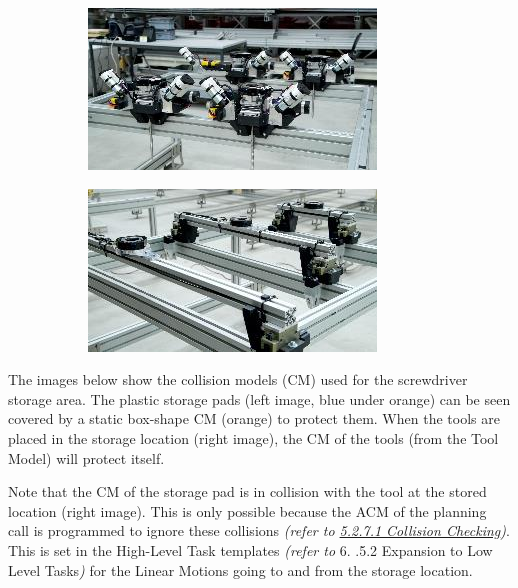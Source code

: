 \documentclass[11pt]{book}
\begin{document}
\begin{figure}[H]
\centering
\begin{subfigure}[b]{0.45\textwidth}
\centering
\includegraphics[width=\textwidth]{./images/image33.jpeg}
\end{subfigure}
\hfill
 \begin{subfigure}[b]{0.45\textwidth}
\centering
\includegraphics[width=\textwidth]{./images/image34.jpeg}
\end{subfigure}
\end{figure}


The images below show the collision models (CM) used for the screwdriver storage area. The plastic storage pads (left image, blue under orange) can be seen covered by a static box-shape CM (orange) to protect them. When the tools are placed in the storage location (right image), the CM of the tools (from the Tool Model) will protect itself.

Note that the CM of the storage pad is in collision with the tool at the stored location (right image). This is only possible because the ACM of the planning call is programmed to ignore these collisions \textit{(refer to \uline{5.2.7.1 Collision Checking})}. This is set in the High-Level Task templates \textit{(refer to }6. \cite{no_auth_3}.5.2 Expansion to Low Level Tasks\textit{)} for the Linear Motions going to and from the storage location.
\end{document}
